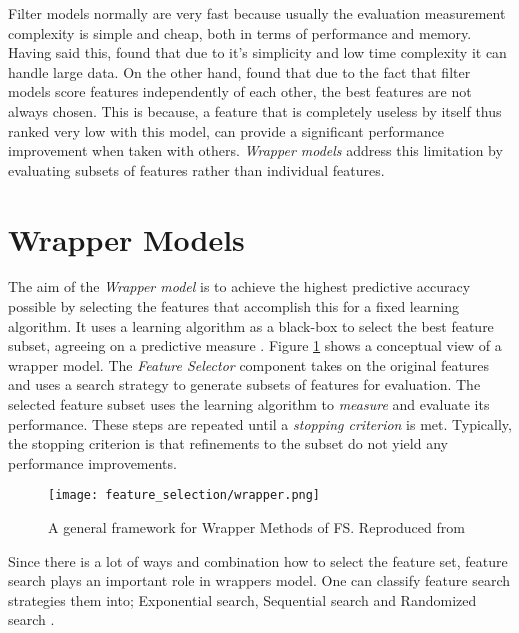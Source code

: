 Filter models normally are very fast because usually the evaluation measurement complexity is simple and cheap, both in terms of performance and memory. Having said this, \citet{garcia2015data} found that due to it's simplicity and low time complexity it can handle large data. On the other hand, \citet{guyon2003introduction} found that due to the fact that filter models score features independently of each other, the best features are not always chosen. This is because, a feature that is completely useless by itself thus ranked very low with this model, can provide a significant performance improvement when taken with others. \textit{Wrapper models} address this limitation by evaluating subsets of features rather than individual features.

\section{Wrapper Models}\label{sec:fs_filter}
The aim of the \textit{Wrapper model} is to achieve the highest predictive accuracy possible by selecting the features that accomplish this for a fixed learning algorithm. It uses a learning algorithm as a black-box to select the best feature subset, agreeing on a predictive measure \citep{kohavi1995study}. Figure \ref{fig:fs_wrapper} shows a conceptual view of a wrapper model. The \textit{Feature Selector} component takes on the original features and uses a search strategy to generate subsets of features for evaluation. The selected feature subset uses the learning algorithm to \textit{measure} and evaluate its performance. These steps are repeated until a \textit{stopping criterion} is met. Typically, the stopping criterion is that refinements to the subset do not yield any performance improvements.

\begin{figure}
  \texttt{[image: feature\_selection/wrapper.png]}
  \caption{A general framework for Wrapper Methods of FS. Reproduced from \citet{tang2014feature}}
  \label{fig:fs_wrapper}
\end{figure}

Since there is a lot of ways and combination how to select the feature set, feature search plays an important role in wrappers model. One can classify feature search strategies them into; Exponential search, Sequential search and Randomized search \citep{de2015feature}.

